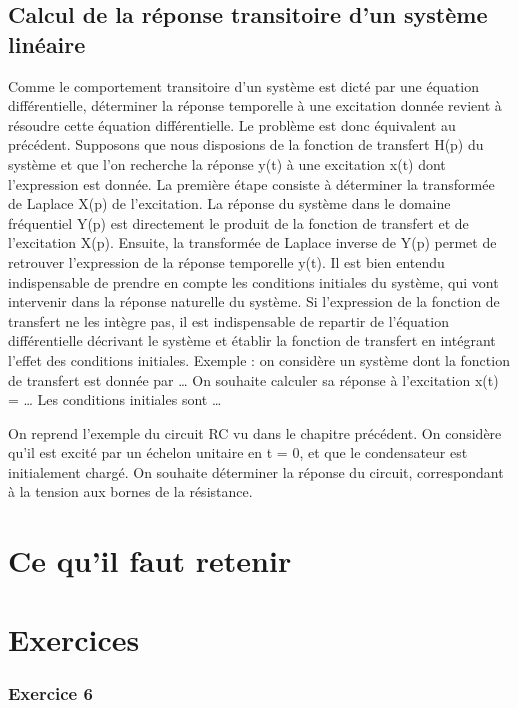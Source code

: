 \documentclass[]{report}
\begin{document}
	\subsection{Calcul de la réponse transitoire d'un système linéaire}
	Comme le comportement transitoire d'un système est dicté par une équation différentielle, déterminer la réponse temporelle à une excitation donnée revient à résoudre cette équation différentielle. Le problème est donc équivalent au précédent. Supposons que nous disposions de la fonction de transfert H(p) du système et que l'on recherche la réponse y(t) à une excitation x(t) dont l'expression est donnée. La première étape consiste à déterminer la transformée de Laplace X(p) de l'excitation. La réponse du système dans le domaine fréquentiel Y(p) est directement le produit de la fonction de transfert et de l'excitation X(p). Ensuite, la transformée de Laplace inverse de Y(p) permet de retrouver l'expression de la réponse temporelle y(t).
	Il est bien entendu indispensable de prendre en compte les conditions initiales du système, qui vont intervenir dans la réponse naturelle du système. Si l'expression de la fonction de transfert ne les intègre pas, il est indispensable de repartir de l'équation différentielle décrivant le système et établir la fonction de transfert en intégrant l'effet des conditions initiales.
	Exemple : on considère un système dont la fonction de transfert est donnée par … On souhaite calculer sa réponse à l'excitation x(t) = … Les conditions initiales sont …
	
	
	On reprend l'exemple du circuit RC vu dans le chapitre précédent. On considère qu'il est excité par un échelon unitaire en t = 0, et que le condensateur est initialement chargé. On souhaite déterminer la réponse du circuit, correspondant à la tension aux bornes de la résistance.
	
	\section{Ce qu'il faut retenir}
	
	\section{Exercices}
	
	
	
	\subsubsection{Exercice 6}
	
\end{document}
